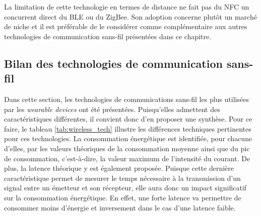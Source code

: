 La limitation de cette technologie en termes de distance ne fait pas du \acs{NFC} un concurrent direct du \acs{BLE} ou du ZigBee. Son adoption concerne plutôt un marché de niche et il est préférable de le considérer comme complémentaire aux autres technologies de communication sans-fil présentées dans ce chapitre.

\subsection{Bilan des technologies de communication sans-fil}

Dans cette section, les technologies de communications sans-fil les plus utilisées par les \textit{wearable devices} ont été présentées. Puisqu'elles admettent des caractéristiques différentes, il convient donc d'en proposer une synthèse. Pour ce faire, le tableau \ref{tab:wireless_tech} illustre les différences techniques pertinentes pour ces technologies. La consommation énergétique est identifiée, pour chacune d'elles, par les valeurs théoriques de la consommation moyenne ainsi que du pic de consommation, c'est-à-dire, la valeur maximum de l'intensité du courant. De plus, la latence théorique y est également proposée. Puisque cette dernière caractéristique permet de mesurer le temps nécessaire à la transmission d'un signal entre un émetteur et son récepteur, elle aura donc un impact significatif sur la consommation énergétique. En effet, une forte latence va permettre de consommer moins d'énergie et inversement dans le cas d'une latence faible.

